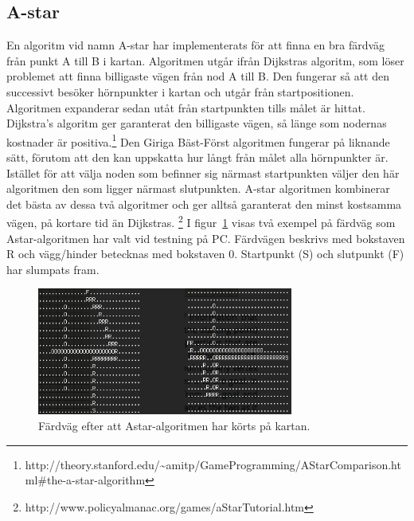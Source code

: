 \documentclass[a4paper,12pt,fleqn]{article}
\begin{document}
\newpage
\subsection{A-star}
En algoritm vid namn A-star har implementerats för att finna en bra färdväg från punkt A till B i kartan. Algoritmen utgår ifrån Dijkstras algoritm, som löser problemet att finna billigaste vägen från nod A till B. Den fungerar så att den successivt besöker hörnpunkter i kartan och utgår från startpositionen. Algoritmen expanderar sedan utåt från startpunkten tills målet är hittat. Dijkstra’s algoritm ger garanterat den billigaste vägen, så länge som nodernas kostnader är positiva.\footnote{http://theory.stanford.edu/\textasciitilde amitp/GameProgramming/AStarComparison.html\#the-a-star-algorithm} Den Giriga Bäst-Först algoritmen fungerar på liknande sätt, förutom att den kan uppskatta hur långt från målet alla hörnpunkter är. Istället för att välja noden som befinner sig närmast startpunkten väljer den här algoritmen den som ligger närmast slutpunkten. A-star algoritmen kombinerar det bästa av dessa två algoritmer och ger alltså garanterat den minst kostsamma vägen, på kortare tid än Dijkstras. \footnote{http://www.policyalmanac.org/games/aStarTutorial.htm}
\newline
I figur~\ref{fig:Astar} visas två exempel på färdväg som Astar-algoritmen har valt vid testning på PC. Färdvägen beskrivs med bokstaven R och vägg/hinder betecknas med bokstaven 0. Startpunkt (S) och slutpunkt (F) har slumpats fram. 

\begin{figure}[htp] %
  \begin{center}
  \includegraphics[width=0.75\textwidth]{Astar.png}  %
  \caption{Färdväg efter att Astar-algoritmen har körts på kartan.}%
  \end{center}
  \label{fig:Astar}
\end{figure}
\end{document}
